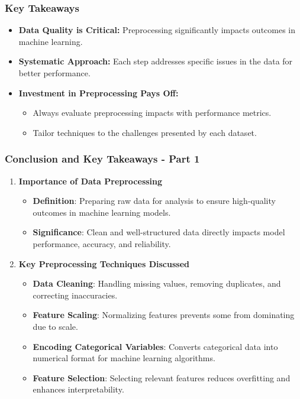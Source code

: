 \documentclass[aspectratio=169]{beamer}
\begin{document}
\begin{frame}[fragile]
    \frametitle{Key Takeaways}
    \begin{itemize}
        \item \textbf{Data Quality is Critical:} Preprocessing significantly impacts outcomes in machine learning.
        \item \textbf{Systematic Approach:} Each step addresses specific issues in the data for better performance.
        \item \textbf{Investment in Preprocessing Pays Off:} 
            \begin{itemize}
                \item Always evaluate preprocessing impacts with performance metrics.
                \item Tailor techniques to the challenges presented by each dataset.
            \end{itemize}
    \end{itemize}
\end{frame}

\begin{frame}[fragile]
  \frametitle{Conclusion and Key Takeaways - Part 1}
  
  \begin{enumerate}
      \item \textbf{Importance of Data Preprocessing}
        \begin{itemize}
            \item \textbf{Definition}: Preparing raw data for analysis to ensure high-quality outcomes in machine learning models.
            \item \textbf{Significance}: Clean and well-structured data directly impacts model performance, accuracy, and reliability.
        \end{itemize}
  
      \item \textbf{Key Preprocessing Techniques Discussed}
          \begin{itemize}
              \item \textbf{Data Cleaning}: Handling missing values, removing duplicates, and correcting inaccuracies.
              \item \textbf{Feature Scaling}: Normalizing features prevents some from dominating due to scale.
              \item \textbf{Encoding Categorical Variables}: Converts categorical data into numerical format for machine learning algorithms.
              \item \textbf{Feature Selection}: Selecting relevant features reduces overfitting and enhances interpretability.
          \end{itemize}
  \end{enumerate}

\end{frame}
\end{document}
